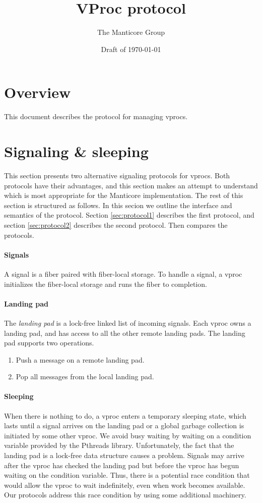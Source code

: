 \documentclass[11pt]{article}
\title{VProc protocol}
\author{The Manticore Group}
\date{Draft of \today}
\begin{document}
\maketitle

\section{Overview}
This document describes the protocol for managing vprocs.

\section{Signaling \& sleeping}\label{sec:signaling-and-sleeping}
This section presents two alternative signaling protocols for vprocs.
Both protocols have their advantages, and this section makes an attempt to understand
which is most appropriate for the Manticore implementation.
The rest of this section is structured as follows.
In this secion we outline the interface and semantics of the protocol.
Section \ref{sec:protocol1} describes the first protocol, and section
\ref{sec:protocol2} describes the second protocol.
Then  compares the protocols.

\paragraph{Signals}
A signal is a fiber paired with fiber-local storage.
To handle a signal, a vproc initializes the fiber-local storage and runs the fiber to completion.

\paragraph{Landing pad}
The \emph{landing pad} is a lock-free linked list of incoming signals.
Each vproc owns a landing pad, and has access to all the other remote landing pads.
The landing pad supports two operations.
\begin{enumerate}
  \item Push a message on a remote landing pad.
  \item Pop all messages from the local landing pad.
\end{enumerate}

\paragraph{Sleeping}
When there is nothing to do, a vproc enters a temporary sleeping state, which lasts until a
signal arrives on the landing pad or a global garbage collection is initiated by some other
vproc.
We avoid busy waiting by waiting on a condition variable provided by the Pthreads
library.
Unfortunately, the fact that the landing pad is a lock-free data structure causes
a problem.
Signals may arrive after the vproc has checked the landing pad but before the vproc has
begun waiting on the condition variable.
Thus, there is a potential race condition that would allow the vproc to wait indefinitely,
even when work becomes available.
Our protocols address this race condition by using some additional machinery.
\end{document}
